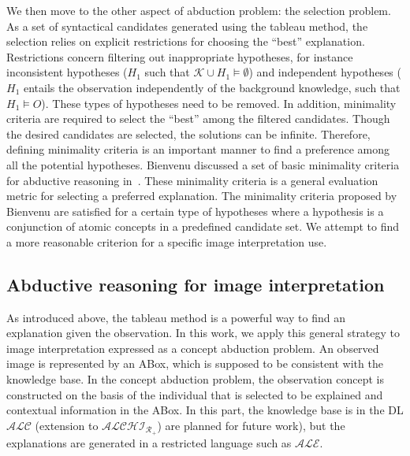 \documentclass{article}
\begin{document}
We then move to the other aspect of abduction problem: the selection problem.
As a set of syntactical candidates generated using the tableau method, the selection relies on explicit restrictions for choosing the ``best'' explanation.
Restrictions concern filtering out inappropriate hypotheses,
for instance inconsistent hypotheses ($H_1$ such that $\mathcal{K}\cup H_1\vDash \emptyset$) and independent hypotheses ($H_1$ entails the observation independently of the background knowledge,
such that $H_1\vDash O$).
These types of hypotheses need to be removed.
In addition, minimality criteria are required to select the ``best'' among the filtered candidates.
Though the desired candidates are selected, the solutions can be infinite.
Therefore, defining minimality criteria is an important manner to find a preference among all the potential hypotheses.
Bienvenu  discussed a set of basic minimality criteria for abductive reasoning in~\cite{bienvenu08complexity}.
These minimality criteria is a general evaluation metric for selecting a preferred explanation. 
The minimality criteria proposed by Bienvenu are satisfied for a certain type of hypotheses where a hypothesis is a conjunction of atomic concepts in a predefined candidate set.
We attempt to find a more reasonable criterion for a specific image interpretation use.

\subsection{Abductive reasoning for image interpretation}
As introduced above, the tableau method is a powerful way to find an explanation given the observation.
In this work, we apply this general strategy to image interpretation expressed as a concept abduction problem.
An observed image is represented by an ABox, which is supposed to be consistent with the knowledge base. 
In the concept abduction problem, the observation concept is constructed on the basis of the individual that is selected to be explained and
contextual information in the ABox.
In this part, the knowledge base is in the DL $\mathcal{ALC}$ (extension to $\mathcal{ALCHI_{R_+}}$) are planned for future work),
but the explanations are generated in a restricted language such as $\mathcal{ALE}$.
\end{document}
